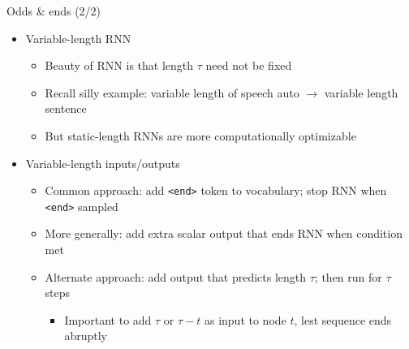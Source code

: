 \begin{frame}{Odds \& ends (2/2)}
    \begin{itemize}
        \item<+-> Variable-length RNN{}
        \begin{itemize}
            \item Beauty of RNN{} is that length $\tau$ need not be fixed
            \item Recall silly example: variable length of speech auto $\to$ variable length sentence
            \item But static-length RNN{}s are more computationally optimizable
        \end{itemize}
        \item<+-> Variable-length inputs/outputs
        \begin{itemize}
            \item Common approach: add \texttt{<end>} token to vocabulary; stop RNN{} when \texttt{<end>} sampled
            \item More generally: add extra scalar output that ends RNN{} when condition met
            \item Alternate approach: add output that predicts length $\tau$; then run for $\tau$ steps
            \begin{itemize}
                \item Important to add $\tau$ or $\tau - t$ as input to node $t$, lest sequence ends abruptly
            \end{itemize}
        \end{itemize}
    \end{itemize}
\end{frame}

